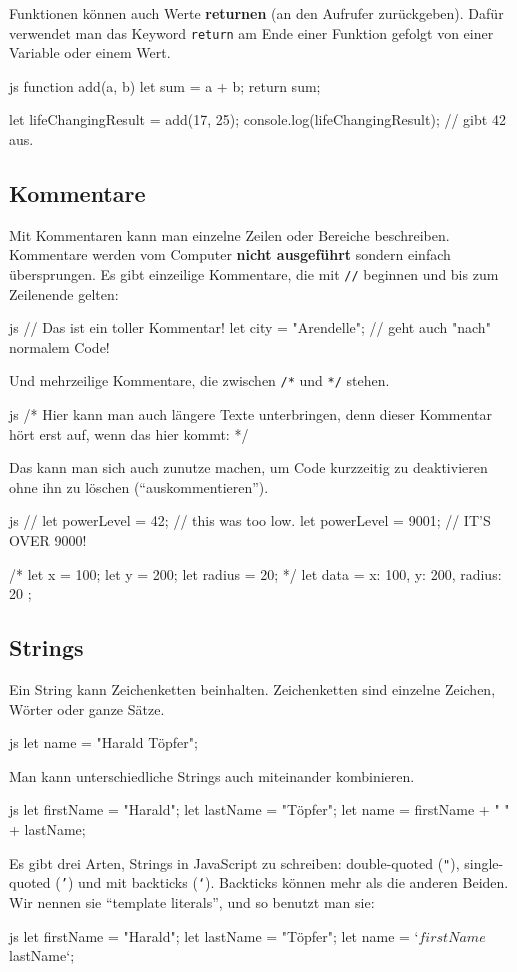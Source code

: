 \documentclass[10pt,a4paper]{article}
\begin{document}
\begin{multicols}{3}
Funktionen können auch Werte \textbf{returnen} (an den Aufrufer zurückgeben). Dafür verwendet man das Keyword \texttt{return} am Ende einer Funktion gefolgt von einer Variable oder einem Wert.
\begin{codebox}{js}{}
  function add(a, b) {
    let sum = a + b;
    return sum;
  }
  
  let lifeChangingResult = add(17, 25);
  console.log(lifeChangingResult); // gibt 42 aus.
\end{codebox}


\subsection*{Kommentare}
Mit Kommentaren kann man einzelne Zeilen oder Bereiche beschreiben. Kommentare werden vom Computer \textbf{nicht ausgeführt} sondern einfach übersprungen. Es gibt einzeilige Kommentare, die mit \texttt{//} beginnen und bis zum Zeilenende gelten:
\begin{codebox}{js}{}
  // Das ist ein toller Kommentar!
  let city = "Arendelle"; // geht auch "nach" normalem Code!
\end{codebox}

Und mehrzeilige Kommentare, die zwischen \texttt{/*} und \texttt{*/} stehen.
\begin{codebox}{js}{}
  /* Hier kann man auch längere Texte unterbringen,
  denn dieser Kommentar hört erst auf, wenn
  das hier kommt: */
\end{codebox}

Das kann man sich auch zunutze machen, um Code kurzzeitig zu deaktivieren ohne ihn zu löschen (\enquote{auskommentieren}).
\begin{codebox}{js}{}
  // let powerLevel = 42; // this was too low.
  let powerLevel = 9001; // IT'S OVER 9000!

  /*
  let x = 100;
  let y = 200;
  let radius = 20;
  */
  let data = {
    x: 100,
    y: 200,
    radius: 20
  };
\end{codebox}

\subsection*{Strings}
Ein String kann Zeichenketten beinhalten. Zeichenketten sind einzelne Zeichen, Wörter oder ganze Sätze.
\begin{codebox}{js}{}
  let name = "Harald Töpfer";
\end{codebox}
Man kann unterschiedliche Strings auch miteinander kombinieren.
\begin{codebox}{js}{}
  let firstName = "Harald";
  let lastName = "Töpfer";
  let name = firstName + " " + lastName;
\end{codebox}
Es gibt drei Arten, Strings in JavaScript zu schreiben: double-quoted (\texttt{"}), single-quoted (\texttt{'}) und mit backticks (\texttt{`}). Backticks können mehr als die anderen Beiden. Wir nennen sie \enquote{template literals}, und so benutzt man sie:
\begin{codebox}{js}{}
  let firstName = "Harald";
  let lastName = "Töpfer";
  let name = `${firstName} ${lastName}`;
\end{codebox}


\end{multicols}
\end{document}
